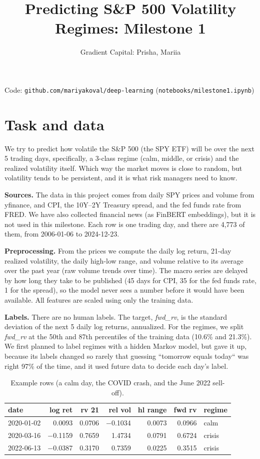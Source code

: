 \documentclass[11pt]{article}
\title{\textbf{Predicting S\&P 500 Volatility Regimes: Milestone 1}}
\author{Gradient Capital: Prisha, Mariia}
\date{}
\begin{document}
\maketitle
\vspace{-2.5em}
\begin{center}
Code: \texttt{github.com/mariyakoval/deep-learning} (\texttt{notebooks/milestone1.ipynb})
\end{center}

\section{Task and data}

We try to predict how volatile the S\&P 500 (the SPY ETF) will be over the next 5 trading 
days, specifically, a 3-class regime (calm, middle, or crisis) and the 
realized volatility itself. Which way the market moves is close to random, but 
volatility tends to be persistent, and it is what risk managers need to know.

\textbf{Sources.} The data in this project comes from daily SPY prices and volume from yfinance, 
and CPI, the 10Y--2Y Treasury spread, and the fed funds rate from FRED. 
We have also collected financial news (as FinBERT embeddings), but it is not used 
in this milestone. Each row is one trading day, and there are 4,773 
of them, from 2006-01-06 to 2024-12-23.

\textbf{Preprocessing.} From the prices we compute the daily log return, 21-day realized volatility, 
the daily high-low range, and volume relative to its average over the past year 
(raw volume trends over time). The macro series are delayed by how long they take 
to be published (45 days for CPI, 35 for the fed funds rate, 1 for the spread), 
so the model never sees a number before it would have been available. 
All features are scaled using only the training data.

\textbf{Labels.} There are no human labels. The target, \textit{fwd\_rv}, is the standard deviation of the next 5 daily 
log returns, annualized. For the regimes, we split \textit{fwd\_rv} at the 50th 
and 87th percentiles of the training data (10.6\% and 21.3\%). We first planned to
label regimes with a hidden Markov model, but gave it up, because its labels changed 
so rarely that guessing ``tomorrow equals today`` was right 97\% of the time, and it 
used future data to decide each day's label.

\begin{table}[h]
\centering
\begin{tabular}{lrrrrrl}
\toprule
date & log ret & rv 21 & rel vol & hl range & fwd rv & regime \\
\midrule
2020-01-02 & 0.0093  & 0.0706 & $-$0.1034 & 0.0073 & 0.0966 & calm \\
2020-03-16 & $-$0.1159 & 0.7659 & 1.4734 & 0.0791 & 0.6724 & crisis \\
2022-06-13 & $-$0.0387 & 0.3170 & 0.7359 & 0.0225 & 0.3515 & crisis \\
\bottomrule
\end{tabular}
\caption{Example rows (a calm day, the COVID crash, and the June 2022 sell-off).}
\end{table}
\end{document}
